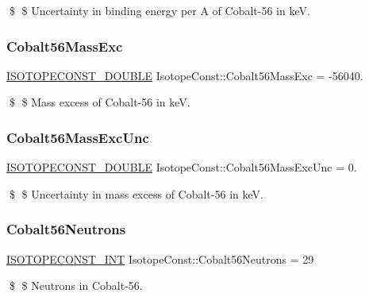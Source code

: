 \$ \$ Uncertainty in binding energy per A of Cobalt-\/56 in keV. \mbox{\label{group___isotope_const-_cobalt-_co56_ga0fb9e3687806ad9c95bfd5e56f116b0c}} 
\subsubsection{\texorpdfstring{Cobalt56\+Mass\+Exc}{Cobalt56MassExc}}
{\footnotesize\ttfamily \mbox{\hyperlink{group___isotope_const-_macros_ga8f45a7272ce02c0b4c65c44636ed719a}{I\+S\+O\+T\+O\+P\+E\+C\+O\+N\+S\+T\+\_\+\+D\+O\+U\+B\+LE}} Isotope\+Const\+::\+Cobalt56\+Mass\+Exc = -\/56040.}

\$ \$ Mass excess of Cobalt-\/56 in keV. \mbox{\label{group___isotope_const-_cobalt-_co56_ga8ac1957c0cdd7336de5a64be430120e1}} 
\subsubsection{\texorpdfstring{Cobalt56\+Mass\+Exc\+Unc}{Cobalt56MassExcUnc}}
{\footnotesize\ttfamily \mbox{\hyperlink{group___isotope_const-_macros_ga8f45a7272ce02c0b4c65c44636ed719a}{I\+S\+O\+T\+O\+P\+E\+C\+O\+N\+S\+T\+\_\+\+D\+O\+U\+B\+LE}} Isotope\+Const\+::\+Cobalt56\+Mass\+Exc\+Unc = 0.}

\$ \$ Uncertainty in mass excess of Cobalt-\/56 in keV. \mbox{\label{group___isotope_const-_cobalt-_co56_gaf5da984179119aac013dfe4b53dc0d05}} 
\subsubsection{\texorpdfstring{Cobalt56\+Neutrons}{Cobalt56Neutrons}}
{\footnotesize\ttfamily \mbox{\hyperlink{group___isotope_const-_macros_ga5f18360b3e99483a35c32d789e62621c}{I\+S\+O\+T\+O\+P\+E\+C\+O\+N\+S\+T\+\_\+\+I\+NT}} Isotope\+Const\+::\+Cobalt56\+Neutrons = 29}

\$ \$ Neutrons in Cobalt-\/56. \mbox{\label{group___isotope_const-_cobalt-_co56_ga3c0c6952e9499ea9d2560b2a66e2d339}} 

